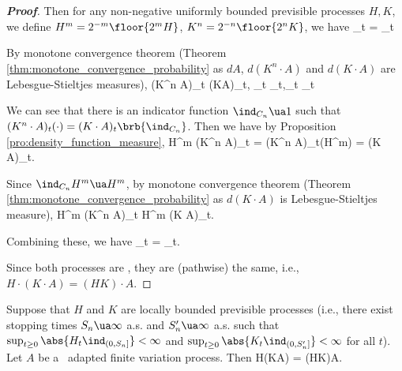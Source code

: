 \begin{proof}[\bf Proof]
Then for any non-negative uniformly bounded previsible processes $H,K$, we define $H^m = 2^{-m}\floor{2^m H}$, $K^n = 2^{-n}\floor{2^n K}$, we have
\be
{}_t = _t
\ee

By monotone convergence theorem (Theorem \ref{thm:monotone_convergence_probability} as $dA$, $d(K^n\cdot A)$ and $d(K\cdot A)$ are Lebesgue-Stieltjes measures),
\be
(K^n \cdot A)_t \ua (K\cdot A)_t, \quad {}_t \ua {}_t,\quad{}_t \ua {}_t
\ee

We can see that there is an indicator function $\ind_{C_n} \ua 1$ such that $(K^n \cdot A)_t(\cdot) = (K \cdot A)_t\brb{\ind_{C_n}}$. Then we have by Proposition \ref{pro:density_function_measure},
\be
H^m \cdot (K^n \cdot A)_t = (K^n \cdot A)_t(H^m) = (K \cdot A)_t.
\ee

Since $\ind_{C_n}H^m \ua H^m$, by monotone convergence theorem (Theorem \ref{thm:monotone_convergence_probability} as $d(K\cdot A)$ is Lebesgue-Stieltjes measure),
\be
H^m \cdot (K^n \cdot A)_t \ua H^m \cdot (K \cdot A)_t.
\ee



Combining these, we have
\be
{}_t =  _t.
\ee

Since both processes are \cadlag, they are (pathwise) the same, i.e., $H\cdot (K\cdot A) = (HK)\cdot A$.
\end{proof}

\begin{theorem}\label{thm:locally_bounded_previsible_finite_variation_integral}
Suppose that $H$ and $K$ are locally bounded previsible processes (i.e., there exist stopping times $S_n\ua \infty$ a.s. and $S_n'\ua \infty$ a.s. such that $\sup_{ t\geq 0} \abs{H_t\ind_{(0,S_n]}} < \infty$ and $\sup_{t\geq 0} \abs{K_t\ind_{(0,S_n']}} < \infty$ for all $t$). Let $A$ be a \cadlag\ adapted finite variation process. Then
\be
H\cdot (K\cdot A) = (HK)\cdot A.
\ee
\end{theorem}

